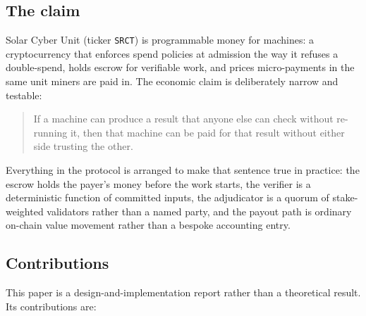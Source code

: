 \documentclass{article}
\begin{document}
\subsection{The claim}

Solar Cyber Unit (ticker \texttt{SRCT}) is programmable money for machines: a cryptocurrency
that enforces spend policies at admission the way it refuses a double-spend, holds
escrow for verifiable work, and prices micro-payments in the same unit miners are
paid in. The economic claim is deliberately
narrow and testable:

\begin{quote}
If a machine can produce a result that anyone else can check without re-running
it, then that machine can be paid for that result without either side trusting
the other.
\end{quote}

Everything in the protocol is arranged to make that sentence true in practice:
the escrow holds the payer's money before the work starts, the verifier is a
deterministic function of committed inputs, the adjudicator is a quorum of
stake-weighted validators rather than a named party, and the payout path is
ordinary on-chain value movement rather than a bespoke accounting entry.

\subsection{Contributions}

This paper is a design-and-implementation report rather than a theoretical
result. Its contributions are:
\end{document}
